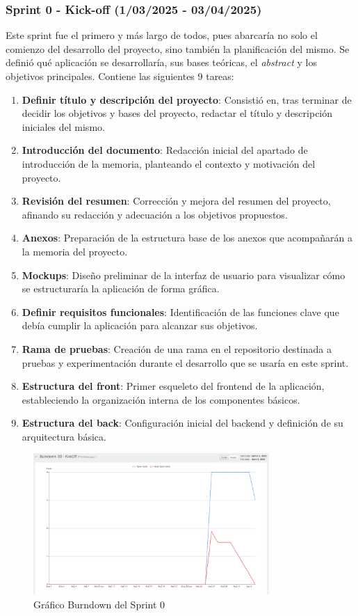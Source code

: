 \subsubsection{Sprint 0 - Kick-off (1/03/2025 - 03/04/2025)}

Este sprint fue el primero y más largo de todos, pues abarcaría no solo el comienzo del desarrollo del proyecto, sino también la planificación del mismo. Se definió qué aplicación se desarrollaría, sus bases teóricas, el \textit{abstract} y los objetivos principales. Contiene las siguientes 9 tareas:

\begin{enumerate}
\item \textbf{Definir título y descripción del proyecto}: Consistió en, tras terminar de decidir los objetivos y bases del proyecto, redactar el título y descripción iniciales del mismo.
\item \textbf{Introducción del documento}: Redacción inicial del apartado de introducción de la memoria, planteando el contexto y motivación del proyecto.
\item \textbf{Revisión del resumen}: Corrección y mejora del resumen del proyecto, afinando su redacción y adecuación a los objetivos propuestos.
\item \textbf{Anexos}: Preparación de la estructura base de los anexos que acompañarán a la memoria del proyecto.
\item \textbf{Mockups}: Diseño preliminar de la interfaz de usuario para visualizar cómo se estructuraría la aplicación de forma gráfica.
\item \textbf{Definir requisitos funcionales}: Identificación de las funciones clave que debía cumplir la aplicación para alcanzar sus objetivos.
\item \textbf{Rama de pruebas}: Creación de una rama en el repositorio destinada a pruebas y experimentación durante el desarrollo que se usaría en este sprint.
\item \textbf{Estructura del front}: Primer esqueleto del frontend de la aplicación, estableciendo la organización interna de los componentes básicos.
\item \textbf{Estructura del back}: Configuración inicial del backend y definición de su arquitectura básica.
\end{enumerate}

\begin{figure}[H]
\centering
\includegraphics[width=0.8\textwidth]{img/BurndownS0.png}
\caption{Gráfico Burndown del Sprint 0}
\label{fig:BurndownS0}
\end{figure}

